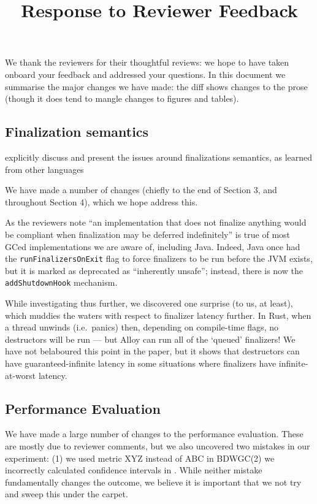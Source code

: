 \documentclass[12pt,a4paper,preprint]{article}
\newcommand\boehm{\textsc{BDWGC}\xspace}
\begin{document}
\date{}  %
\title{Response to Reviewer Feedback}
\maketitle

We thank the reviewers for their thoughtful reviews: we hope to have
taken onboard your feedback and addressed your questions. In this document
we summarise the major changes we have made: the diff shows changes to the prose
(though it does tend to mangle changes to figures and tables).


\subsection*{Finalization semantics}

\begin{blockquote}
explicitly discuss and present the issues around finalizations semantics, as
  learned from other languages
\end{blockquote}

We have made a number of changes (chiefly to the end of Section 3, and
throughout Section 4), which we hope address this.

As the reviewers note ``an
implementation that does not finalize anything would be compliant when
finalization may be deferred indefinitely'' is true of most GCed
implementations we are aware of, including Java. Indeed, Java once had the
\lstinline{runFinalizersOnExit} flag to force finalizers to be run before the
JVM exists, but it is marked as deprecated as ``inherently unsafe''; instead,
there is now the \lstinline{addShutdownHook} mechanism.

While investigating thus further, we discovered one surprise (to us, at least),
which muddies the waters with respect to finalizer latency further. In Rust,
when a thread unwinds (i.e.~panics) then, depending on compile-time flags, no
destructors will be run --- but Alloy can run all of the `queued' finalizers!
We have not belaboured this point in the paper, but it shows that destructors
can have guaranteed-infinite latency in some situations where finalizers have
infinite-at-worst latency.


\subsection*{Performance Evaluation}

We have made a large number of changes to the performance evaluation. These are
mostly due to reviewer comments, but we also uncovered two mistakes in our
experiment: (1) we used metric XYZ instead of ABC in \boehm (2) we incorrectly
calculated confidence intervals in . While neither mistake
fundamentally changes the outcome, we believe it is important that we not
try and sweep this under the carpet.
\end{document}

